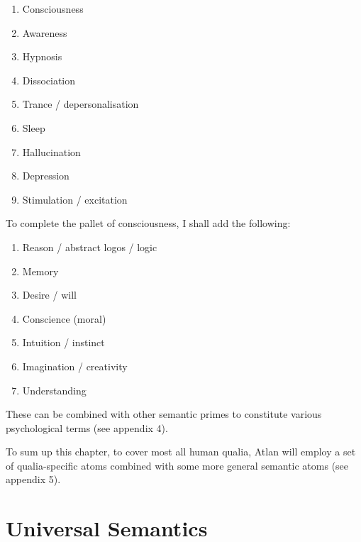 \begin{enumerate}
\item   Consciousness 

\item   Awareness 

\item   Hypnosis 

\item   Dissociation 

\item   Trance / depersonalisation 

\item   Sleep 

\item   Hallucination 

\item   Depression 

\item   Stimulation / excitation
\end{enumerate}
 

\noindent To complete the pallet of consciousness, I shall add the following: 
\setcounter{enumi}{9}
\begin{enumerate}
\item   Reason / abstract logos / logic 

\item   Memory 

\item   Desire / will 

\item   Conscience (moral) 

\item   Intuition / instinct 

\item   Imagination / creativity 

\item   Understanding
\end{enumerate}

\noindent These can be combined with other semantic primes to constitute various psychological terms (see appendix 4).  

To sum up this chapter, to cover most all human qualia, Atlan will employ a set of qualia-specific atoms combined with some more general semantic atoms (see appendix 5).

\section{Universal Semantics}

